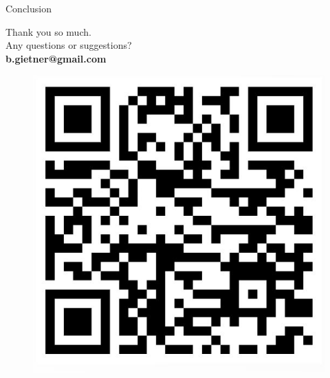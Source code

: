 \documentclass{beamer}
\begin{document}
\begin{frame}{Conclusion}
\begin{center}
Thank you so much.\\
Any questions or suggestions? \\
\textbf{b.gietner@gmail.com}

\begin{figure}[h!]
    \centering
    \includegraphics[width=0.3\linewidth]{QR_Code.JPG}
    \label{fig:your_label}
\end{figure}



\end{center}
    
\end{frame}
\end{document}
